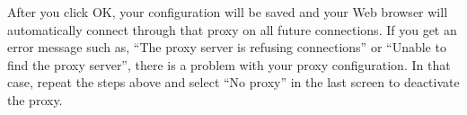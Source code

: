 After you click OK, your configuration will be saved and your Web
browser will automatically connect through that proxy on all future
connections. If you get an error message such as, ``The proxy server is
refusing connections'' or ``Unable to find the proxy server'', there is
a problem with your proxy configuration. In that case, repeat the steps
above and select ``No proxy'' in the last screen to deactivate the
proxy.
